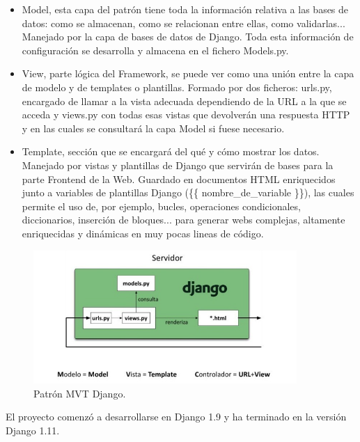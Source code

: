 \documentclass[11pt,a4paper]{book}
\begin{document}
				\begin{itemize}
					\item Model, esta capa del patrón tiene toda la información relativa a las bases de datos: como se almacenan, como se relacionan entre ellas, como validarlas... Manejado por la capa de bases de datos de Django. Toda esta información de configuración se desarrolla y almacena en el fichero Models.py.\\
					
					
					\item View, parte lógica del Framework, se puede ver como una unión entre la capa de modelo y de templates o plantillas. Formado por dos ficheros: urls.py, encargado de llamar a la vista adecuada dependiendo de la URL a la que se acceda y views.py con todas esas vistas que devolverán una respuesta HTTP y en las cuales se consultará la capa Model si fuese necesario.\\
					
					
					\item Template, sección que se encargará del qué y cómo mostrar los datos. Manejado por vistas y plantillas de Django que servirán de bases para la parte Frontend de la Web. Guardado en documentos HTML enriquecidos junto a variables de plantillas Django (\{\{ nombre\_de\_variable \}\}), las cuales permite el uso de, por ejemplo, bucles, operaciones condicionales, diccionarios, inserción de bloques... para generar webs complejas, altamente enriquecidas y dinámicas en muy pocas lineas de código.
					
				\end{itemize}
			
				\begin{figure}[H]
				 	\centering
				 	\includegraphics[width=10cm, keepaspectratio]{img/django_MTV.png}
				 	\caption{Patrón MVT Django.}
				 	\label{fig:MTV_Django}
				 \end{figure}
			 
				El proyecto comenzó a desarrollarse en Django 1.9 y ha terminado en la versión Django 1.11.
				
\end{document}
